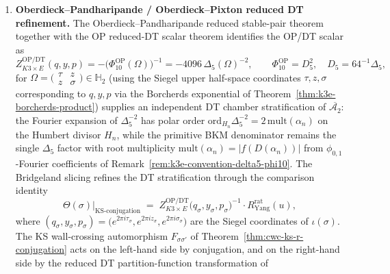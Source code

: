 \begin{theorem}
\begin{enumerate}[label=\textup{(P\arabic*)}]
\begin{enumerate}[label=\textup{(\alph*)}]
 $\Theta(\sigma_{H_4})=R^{\mathrm{ell,dyn}}_{\mathrm{Felder}}(u,\lambda,\rho)$
 with $(\tau,\rho)$ swapped
 (Theorem~\ref{thm:cwc-global-dictionary}(iii) supra, second
 Humbert component).
 \end{enumerate}
 The geometric codimension is independent of the Humbert discriminant
 label: each $H_n\subset\overline{\mathcal{A}_2}$ is a divisor
 (codimension-$1$ Siegel-modular locus), and
 $\dim_\mathbb{C}\overline{\mathcal{A}_2}=3$, so
 $\dim\mathcal{H}_{\le 3}=2$ and the bi-crossing is
 Cartier-effectively built from at most three divisor components. Cross-check: this
 matches the universal genus-$2$ truncation
 $k_{\max}(2)=3$ exactly.
\item \textbf{Oberdieck--Pandharipande / Oberdieck--Pixton reduced DT refinement.} The
 Oberdieck--Pandharipande reduced stable-pair theorem together with
 the OP reduced-DT scalar theorem identifies the OP/DT scalar as
 \[
 Z^{\mathrm{OP/DT}}_{K3\times E}(q,y,p)
 =
 -\bigl(\Phi_{10}^{\mathrm{OP}}(\Omega)\bigr)^{-1}
 =
 -4096\,\Delta_5(\Omega)^{-2},
 \qquad
 \Phi_{10}^{\mathrm{OP}}=D_5^2,\quad D_5=64^{-1}\Delta_5,
 \]
 for $\Omega=\bigl(\begin{smallmatrix}\tau & z\\ z & \sigma\end{smallmatrix}\bigr)\in\mathbb{H}_2$
 (using the Siegel upper half-space coordinates $\tau,z,\sigma$
 corresponding to $q,y,p$ via the Borcherds exponential of
 Theorem~\ref{thm:k3e-borcherds-product}) supplies an independent DT
 chamber stratification of $\overline{\mathcal{A}_2}$: the Fourier
 expansion of $\Delta_5^{-2}$ has polar order
 $\mathrm{ord}_{H_n}\Delta_5^{-2}=2\,\mathrm{mult}(\alpha_n)$ on the
 Humbert divisor $H_n$, while the primitive BKM denominator remains the
 single $\Delta_5$ factor with root multiplicity
 $\mathrm{mult}(\alpha_n)=|f(D(\alpha_n))|$ from
 $\phi_{0,1}$-Fourier coefficients of
 Remark~\ref{rem:k3e-convention-delta5-phi10}. The Bridgeland
 slicing refines the DT stratification through the comparison
 identity
 \[
 \Theta(\sigma)\bigr|_{\mathrm{KS\text{-}conjugation}}
 \;=\;
 Z^{\mathrm{OP/DT}}_{K3\times E}\bigl(q_\sigma,y_\sigma,p_\sigma\bigr)^{-1}
 \cdot R^{\mathrm{rat}}_{\mathrm{Yang}}(u),
 \]
 where $(q_\sigma,y_\sigma,p_\sigma)=\bigl(e^{2\pi i\tau_\sigma},
 e^{2\pi i z_\sigma},e^{2\pi i\sigma_\sigma}\bigr)$ are the Siegel
 coordinates of $\iota(\sigma)$. The KS wall-crossing automorphism
 $F_{\sigma\sigma'}$ of Theorem~\ref{thm:cwc-ks-r-conjugation}
 acts on the left-hand side by conjugation, and on the right-hand
 side by the reduced DT partition-function transformation of

\end{enumerate}
\end{theorem}
